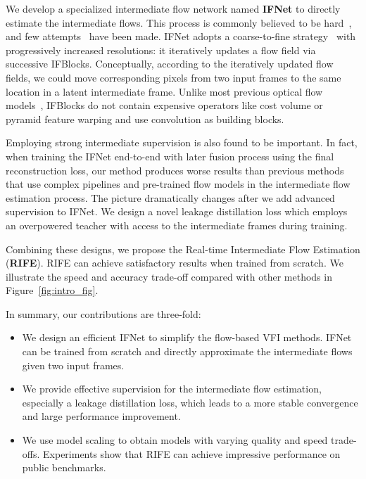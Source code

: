 \documentclass[10pt,twocolumn,letterpaper]{article}
\begin{document}
We develop a specialized intermediate flow network named \textbf{IFNet} to directly estimate the intermediate flows. This process is commonly believed to be hard~\cite{jiang2018super, xu2019quadratic}, and few attempts~\cite{liu2017video, bao2019memc} have been made. IFNet adopts a coarse-to-fine strategy~\cite{ilg2017flownet} with progressively increased resolutions: it iteratively updates a flow field via successive IFBlocks. Conceptually, according to the iteratively updated flow fields, we could move corresponding pixels from two input frames to the same location in a 
latent intermediate frame. Unlike most previous optical flow models~\cite{dosovitskiy2015flownet, ilg2017flownet, sun2018pwc, hui2018liteflownet, teed2020raft}, IFBlocks do not contain expensive operators like cost volume or pyramid feature warping and use  convolution as building blocks.



Employing strong intermediate supervision is also found to be important. In fact, when training the IFNet end-to-end with later fusion process using the final reconstruction loss, our method produces worse results than previous methods that use complex pipelines and pre-trained flow models in the intermediate flow estimation process. The picture dramatically changes after we add advanced supervision to IFNet. We design a novel leakage distillation loss which employs an overpowered teacher with access to the intermediate frames during training.

Combining these designs, we propose the Real-time Intermediate Flow Estimation (\textbf{RIFE}). RIFE can achieve satisfactory results when trained from scratch. We illustrate the speed and accuracy trade-off compared with other methods in Figure~\ref{fig:intro_fig}. 

In summary, our contributions are three-fold:\vspace{-0.5em}
\begin{itemize}
	\item We design an efficient IFNet to simplify the flow-based VFI methods. IFNet can be trained from scratch and directly approximate the intermediate flows given two input frames.\vspace{-0.5em}
	\item We provide effective supervision for the intermediate flow estimation, especially a leakage distillation loss, which leads to a more stable convergence and large performance improvement. \vspace{-0.5em}
	\item We use model scaling to obtain models with varying quality and speed trade-offs. Experiments show that RIFE can achieve impressive performance on public benchmarks. \vspace{-0.5em}
\end{itemize}
\end{document}
